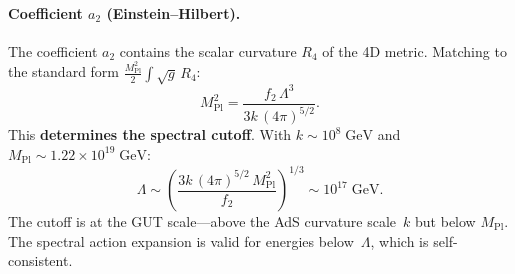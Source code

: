 \paragraph{Coefficient $a_2$ (Einstein--Hilbert).}
The coefficient $a_2$ contains the scalar curvature $R_4$ of the 4D metric. Matching to the standard form $\frac{M_{\mathrm{Pl}}^2}{2} \int \sqrt{g}\, R_4$:
\begin{equation}
  M_{\mathrm{Pl}}^2 = \frac{f_2\, \Lambda^3}{3k\, (4\pi)^{5/2}}.
  \label{eq:4-22}
\end{equation}
This \textbf{determines the spectral cutoff}. With $k \sim 10^8\;\mathrm{GeV}$ and $M_{\mathrm{Pl}} \sim 1.22 \times 10^{19}\;\mathrm{GeV}$:
\begin{equation}
  \Lambda \sim \left(\frac{3k\, (4\pi)^{5/2}\, M_{\mathrm{Pl}}^2}{f_2}\right)^{1/3} \sim 10^{17}\;\mathrm{GeV}.
  \label{eq:4-23}
\end{equation}
The cutoff is at the GUT scale---above the AdS curvature scale~$k$ but below $M_{\mathrm{Pl}}$. The spectral action expansion is valid for energies below~$\Lambda$, which is self-consistent.

